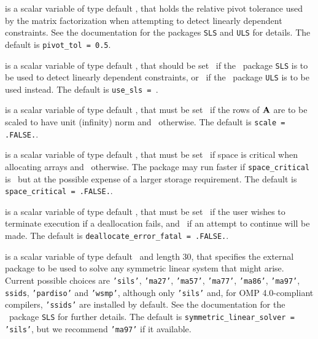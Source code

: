\documentclass{galahad}
\newcommand{\packagename}{FDC}
\newcommand{\fullpackagename}{\libraryname\_\-\packagename}
\begin{document}
\begin{description}
 is a scalar variable of type default
\realdp, that holds the
relative pivot  tolerance used by the matrix factorization when
attempting to detect linearly dependent constraints.
See the documentation for the packages {\tt SLS} and {\tt ULS} for details.
The default is {\tt pivot\_tol = 0.5}.


 is a scalar variable of type default
\logical, that should be set \true\ if the
\libraryname\ package {\tt SLS} is to be used
to detect linearly dependent constraints, or \false\ if
the \libraryname\ package {\tt ULS} is to be used instead.
The default is {\tt use\_sls = }\false.

 is a scalar variable of type default \logical,
that must be set \true\ if the rows of ${\mathbf{A}}$ are to be scaled to
have unit (infinity) norm and  \false\ otherwise.
The default is {\tt scale = .FALSE.}.

 is a scalar variable of type default \logical,
that must be set \true\ if space is critical when allocating arrays
and  \false\ otherwise. The package may run faster if
{\tt space\_critical} is \false\ but at the possible expense of a larger
storage requirement. The default is {\tt space\_critical = .FALSE.}.

 is a scalar variable of type default \logical,
that must be set \true\ if the user wishes to terminate execution if
a deallocation  fails, and \false\ if an attempt to continue
will be made. The default is {\tt deallocate\_error\_fatal = .FALSE.}.

 is a scalar variable of type default 
\character\ and length 30, that specifies the external package to be used to
solve any symmetric linear system that might arise. Current possible
choices are {\tt 'sils'}, {\tt 'ma27'}, {\tt 'ma57'}, {\tt 'ma77'},
{\tt 'ma86'}, {\tt 'ma97'}, {\tt ssids}, {\tt 'pardiso'}
and {\tt 'wsmp'},
although only {\tt 'sils'} and, for OMP 4.0-compliant compilers,
{\tt 'ssids'} are installed by default.
See the documentation for the \galahad\ package {\tt SLS} for further details.
The default is {\tt symmetric\_linear\_solver = 'sils'},
but we recommend {\tt 'ma97'} if it available.


\end{description}
\end{document}
